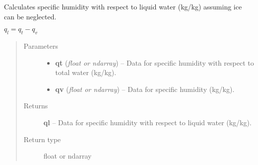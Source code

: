 \documentclass[letterpaper,10pt,english]{sphinxmanual}
\begin{document}
\begin{fulllineitems}
\label{atmos:atmos.equations.ql_from_qt_qv}
Calculates specific humidity with respect to liquid water (kg/kg) assuming ice
can be neglected.

\(q_l = q_t-q_v\)
\begin{quote}\begin{description}
\item[{Parameters}] \leavevmode\begin{itemize}
\item {} 
\textbf{qt} (\emph{float or ndarray}) -- Data for specific humidity with respect to total water (kg/kg).

\item {} 
\textbf{qv} (\emph{float or ndarray}) -- Data for specific humidity (kg/kg).

\end{itemize}

\item[{Returns}] \leavevmode
\textbf{ql} --
Data for specific humidity with respect to liquid water (kg/kg).

\item[{Return type}] \leavevmode
float or ndarray

\end{description}\end{quote}

\end{fulllineitems}

\end{document}
